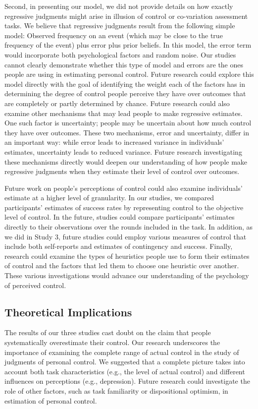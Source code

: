 \documentclass[USenglish,letterpaper,12pt,extrafontsizes,oneside,onecolumn,final]{memoir}
\begin{document}
Second, in presenting our model, we did not provide details on how exactly regressive judgments might arise in illusion of control or co-variation assessment tasks. We believe that regressive judgments result from the following simple model: Observed frequency on an event (which may be close to the true frequency of the event) plus error plus prior beliefs. In this model, the error term would incorporate both psychological factors and random noise. Our studies cannot clearly demonstrate whether this type of model and errors are the ones people are using in estimating personal control. Future research could explore this model directly with the goal of identifying the weight each of the factors has in determining the degree of control people perceive they have over outcomes that are completely or partly determined by chance. Future research could also examine other mechanisms that may lead people to make regressive estimates. One such factor is uncertainty; people may be uncertain about how much control they have over outcomes. These two mechanisms, error and uncertainty, differ in an important way: while error leads to increased variance in individuals' estimates, uncertainty leads to reduced variance.  Future research investigating these mechanisms directly would deepen our understanding of how people make regressive judgments when they estimate their level of control over outcomes.

Future work on people's perceptions of control could also examine individuals' estimate at a higher level of granularity. In our studies, we compared participants' estimates of success rates by representing control to the objective level of control. In the future, studies could compare participants' estimates directly to their observations over the rounds included in the task. In addition, as we did in Study 3, future studies could employ various measures of control that include both self-reports and estimates of contingency and success. Finally, research could examine the types of heuristics people use to form their estimates of control and the factors that led them to choose one heuristic over another. These various investigations would advance our understanding of the psychology of perceived control.

\subsection{Theoretical Implications}
The results of our three studies cast doubt on the claim that people systematically overestimate their control. Our research underscores the importance of examining the complete range of actual control in the study of judgments of personal control. We suggested that a complete picture takes into account both task characteristics (e.g., the level of actual control) and different influences on perceptions (e.g., depression). Future research could investigate the role of other factors, such as task familiarity or dispositional optimism, in estimation of personal control. 
\end{document}
